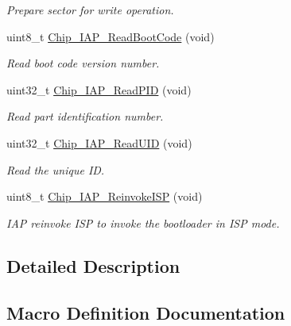 \begin{DoxyCompactItemize}
\begin{DoxyCompactList}\small\item\em Prepare sector for write operation. \end{DoxyCompactList}\item 
uint8\+\_\+t \hyperlink{group__COMMON__IAP_ga478acfa6d97211d4f43edfa8717dc066}{Chip\+\_\+\+I\+A\+P\+\_\+\+Read\+Boot\+Code} (void)
\begin{DoxyCompactList}\small\item\em Read boot code version number. \end{DoxyCompactList}\item 
uint32\+\_\+t \hyperlink{group__COMMON__IAP_gaa4b90551649db0627dc195acfc834cbe}{Chip\+\_\+\+I\+A\+P\+\_\+\+Read\+P\+ID} (void)
\begin{DoxyCompactList}\small\item\em Read part identification number. \end{DoxyCompactList}\item 
uint32\+\_\+t \hyperlink{group__COMMON__IAP_ga2835e129423f1ce0628004a8adf00773}{Chip\+\_\+\+I\+A\+P\+\_\+\+Read\+U\+ID} (void)
\begin{DoxyCompactList}\small\item\em Read the unique ID. \end{DoxyCompactList}\item 
uint8\+\_\+t \hyperlink{group__COMMON__IAP_ga91a6ef5cac3a052f637cf0b5d7d31d53}{Chip\+\_\+\+I\+A\+P\+\_\+\+Reinvoke\+I\+SP} (void)
\begin{DoxyCompactList}\small\item\em I\+AP reinvoke I\+SP to invoke the bootloader in I\+SP mode. \end{DoxyCompactList}\end{DoxyCompactItemize}


\subsection{Detailed Description}


\subsection{Macro Definition Documentation}
